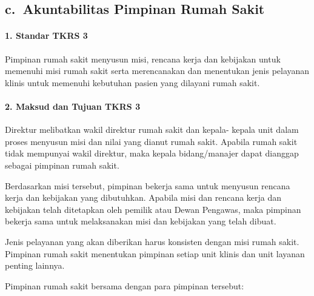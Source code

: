 \documentclass[
]{book}
\begin{document}
\hypertarget{c.-akuntabilitas-pimpinan-rumah-sakit}{%
\subsection*{c.~Akuntabilitas Pimpinan Rumah Sakit}\label{c.-akuntabilitas-pimpinan-rumah-sakit}}

\hypertarget{standar-tkrs-3}{%
\paragraph*{1. Standar TKRS 3}\label{standar-tkrs-3}}

Pimpinan rumah sakit menyusun misi, rencana kerja dan kebijakan untuk memenuhi misi rumah sakit serta merencanakan dan menentukan jenis pelayanan klinis untuk memenuhi kebutuhan pasien yang dilayani rumah sakit.

\hypertarget{maksud-dan-tujuan-tkrs-3}{%
\paragraph*{2. Maksud dan Tujuan TKRS 3}\label{maksud-dan-tujuan-tkrs-3}}

Direktur melibatkan wakil direktur rumah sakit dan kepala- kepala unit dalam proses menyusun misi dan nilai yang dianut rumah sakit. Apabila rumah sakit tidak mempunyai wakil direktur, maka kepala bidang/manajer dapat dianggap sebagai pimpinan rumah sakit.

Berdasarkan misi tersebut, pimpinan bekerja sama untuk menyusun rencana kerja dan kebijakan yang dibutuhkan. Apabila misi dan rencana kerja dan kebijakan telah ditetapkan oleh pemilik atau Dewan Pengawas, maka pimpinan bekerja sama untuk melaksanakan misi dan kebijakan yang telah dibuat.

Jenis pelayanan yang akan diberikan harus konsisten dengan misi rumah sakit. Pimpinan rumah sakit menentukan pimpinan setiap unit klinis dan unit layanan penting lainnya.

Pimpinan rumah sakit bersama dengan para pimpinan tersebut:
\end{document}
